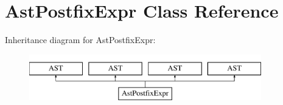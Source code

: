 \hypertarget{classAstPostfixExpr}{\section{Ast\-Postfix\-Expr Class Reference}
\label{classAstPostfixExpr}
}
Inheritance diagram for Ast\-Postfix\-Expr\-:\begin{figure}[H]
\begin{center}
\leavevmode
\includegraphics[height=2.000000cm]{classAstPostfixExpr}
\end{center}
\end{figure}
